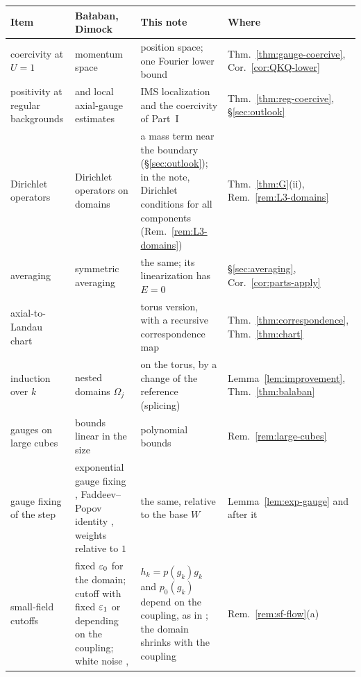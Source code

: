 \begin{table}[tbp]
\centering\footnotesize
\renewcommand{\arraystretch}{1.0}\setlength{\tabcolsep}{4pt}
\begin{tabular}{|p{}|p{}|p{}|p{}|}
\hline
Item & Ba\l aban, Dimock & This note & Where\tabularnewline
\hline
\raggedright coercivity at $U=1$ & \raggedright momentum space \cite{BalPropI} & \raggedright position space; one Fourier lower bound & \raggedright Thm.~\ref{thm:gauge-coercive}, Cor.~\ref{cor:QKQ-lower}\tabularnewline
\raggedright positivity at regular backgrounds & \raggedright \cite[Theorem~3.11]{BalBackground} and local axial-gauge estimates \cite[Lemma~2.4]{BalPropII} & \raggedright IMS localization and the coercivity of Part~I & \raggedright Thm.~\ref{thm:reg-coercive}, \S\ref{sec:outlook}\tabularnewline
\raggedright Dirichlet operators & \raggedright Dirichlet operators on domains \cite{BalBackground} & \raggedright a mass term near the boundary (\S\ref{sec:outlook}); in the note, Dirichlet conditions for all components (Rem.~\ref{rem:L3-domains}) & \raggedright Thm.~\ref{thm:G}(ii), Rem.~\ref{rem:L3-domains}\tabularnewline
\raggedright averaging & \raggedright symmetric averaging \cite[(0.3)--(0.12)]{BalYM4I} & \raggedright the same; its linearization has $E=0$ & \raggedright \S\ref{sec:averaging}, Cor.~\ref{cor:parts-apply}\tabularnewline
\raggedright axial-to-Landau chart & \raggedright \cite[Theorem~2]{BalReg} & \raggedright torus version, with a recursive correspondence map & \raggedright Thm.~\ref{thm:correspondence}, Thm.~\ref{thm:chart}\tabularnewline
\raggedright induction over $k$ & \raggedright nested domains $\Omega_j$ \cite[Sect.~F]{BalVar} & \raggedright on the torus, by a change of the reference (splicing) & \raggedright Lemma~\ref{lem:improvement}, Thm.~\ref{thm:balaban}\tabularnewline
\raggedright gauges on large cubes & \raggedright bounds linear in the size \cite[(9), (10)]{BalVar} & \raggedright polynomial bounds & \raggedright Rem.~\ref{rem:large-cubes}\tabularnewline
\raggedright gauge fixing of the step & \raggedright exponential gauge fixing \cite[(0.14)--(0.19)]{BalYM4I}, Faddeev--Popov identity \cite[(0.15)--(0.16)]{BalYM4I}, weights relative to $1$ & \raggedright the same, relative to the base $W$ & \raggedright Lemma~\ref{lem:exp-gauge} and after it\tabularnewline
\raggedright small-field cutoffs & \raggedright fixed $\varepsilon_0$ for the domain; cutoff \cite[(2.9)]{BalYM4I} with fixed $\varepsilon_1$ or depending on the coupling; white noise \cite[(2.10)]{BalYM4I}, \cite[(206)]{DimockI} & \raggedright $h_k=p(g_k)g_k$ and $p_0(g_k)$ depend on the coupling, as in \cite{DimockI}; the domain shrinks with the coupling & \raggedright Rem.~\ref{rem:sf-flow}(a)\tabularnewline

\end{tabular}
\end{table}
